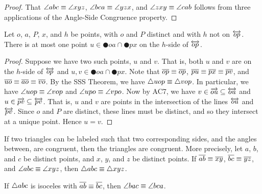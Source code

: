 \begin{proof}
That $\angle{abc} \equiv \angle{xyz}$, $\angle{bca} \equiv \angle{yzx}$, and $\angle{zxy} \equiv \angle{cab}$ follows from three applications of the Angle-Side Congruence property.
\end{proof}

\begin{prop}
Let $o$, $a$, \(P\), $x$, and $h$ be points, with $o$ and \(P\) distinct and with $h$ not on $\overleftrightarrow{op}$. There is at most one point $u \in \CIRCLE{o}{a} \cap \CIRCLE{p}{x}$ on the $h$-side of $\overleftrightarrow{op}$.
\end{prop}

\begin{proof}
Suppose we have two such points, $u$ and $v$. That is, both $u$ and $v$ are on the $h$-side of $\overleftrightarrow{op}$ and $u,v \in \CIRCLE{o}{a} \cap \CIRCLE{p}{x}$. Note that $\overline{op} \equiv \overline{op}$, $\overline{pu} \equiv \overline{px} \equiv \overline{pv}$, and $\overline{uo} \equiv \overline{ao} \equiv \overline{vo}$. By the SSS Theorem, we have $\bigtriangleup{uop} \equiv \bigtriangleup{vop}$. In particular, we have $\angle{uop} \equiv \angle{vop}$ and $\angle{upo} \equiv \angle{vpo}$. Now by AC7, we have $v \in \overrightarrow{ou} \subseteq \overleftrightarrow{ou}$ and $u \in \overrightarrow{pv} \subseteq \overleftrightarrow{pv}$. That is, $u$ and $v$ are points in the intersection of the lines $\overleftrightarrow{ou}$ and $\overleftrightarrow{pv}$. Since $o$ and \(P\) are distinct, these lines must be distinct, and so they intersect at a unique point. Hence $u = v$.
\end{proof}

\begin{prop}
If two triangles can be labeled such that two corresponding sides, and the angles between, are congruent, then the triangles are congruent. More precisely, let $a$, $b$, and $c$ be distinct points, and $x$, $y$, and $z$ be distinct points. If $\overline{ab} \equiv \overline{xy}$, $\overline{bc} \equiv \overline{yz}$, and $\angle{abc} \equiv \angle{xyz}$, then $\bigtriangleup{abc} \equiv \bigtriangleup{xyz}$.
\end{prop}

\begin{prop}
If $\bigtriangleup{abc}$ is isoceles with $\overline{ab} \equiv \overline{bc}$, then $\angle{bac} \equiv \angle{bca}$.
\end{prop}


